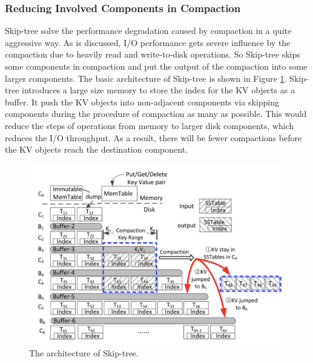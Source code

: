 \documentclass[a4paper,10pt,twoside]{article}
\begin{document}
\subsubsection{Reducing Involved Components in Compaction}
Skip-tree \cite{7569086} solve the performance degradation caused by compaction in a quite aggressive way.
As is discussed, I/O performance gets severe influence by the compaction due to heavily read and write-to-disk operations.
So Skip-tree skips some components in compaction and put the output of the compaction into some larger components.
The basic architecture of Skip-tree is shown in Figure \ref{fig:mesh3}.
Skip-tree introduces a large size memory to store the index for the KV objects as a buffer.
It push the KV objects into non-adjacent components via skipping components during the procedure of compaction as many as possible.
This would reduce the steps of operations from memory to larger disk components, which reduces the I/O throughput.
As a result, there will be fewer compactions before the KV objects reach the destination component.
\begin{figure}[h]
    \centering
	\includegraphics[scale=0.5]{Skip-tree.png}
    \caption{ The architecture of Skip-tree. \cite{7569086}}
    \label{fig:mesh3}
\end{figure}
\end{document}

